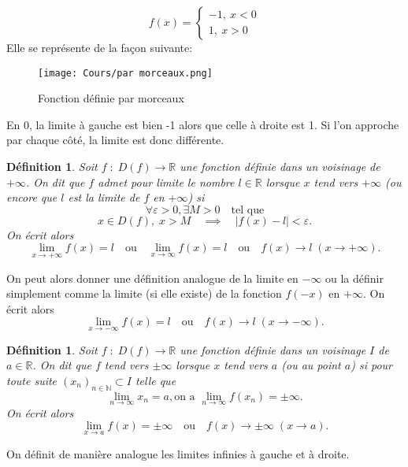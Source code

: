 \documentclass[a4paper, 12pt, french, twoside]{article}
\newtheorem{defi}[theorem]{Définition}
\newcommand{\Nn}{{\mathbb{N}}}
\newcommand{\Rr}{{\mathbb{R}}}
\begin{document}
\begin{equation}
    f(x)=\begin{cases}
        -1, ~ x< 0\\
        1,~ x>0
    \end{cases}
\end{equation}
Elle se représente de la façon suivante:
\begin{figure}[H]
    \centering
    \texttt{[image: Cours/par morceaux.png]}
    \caption{Fonction définie par morceaux    }
    \label{fig:enter-label}
\end{figure}
En 0, la limite à gauche est bien -1 alors que celle à droite est 1. Si l'on approche par chaque côté, la limite est donc différente.
\begin{defi}
    Soit $f\;:\;D(f)\longrightarrow\Rr$ une fonction définie dans un voisinage de $+\infty$.
    On dit que $f$ admet pour limite le nombre $l\in\Rr$ lorsque $x$ tend vers $+\infty$ (ou encore que $l$ est la limite de $f$ en $+\infty$) si
     \[
    \forall \varepsilon>0,\exists M>0 \quad\text{tel que}
    \]
    \[
    x\in D(f), \;x>M \quad \implies \quad |f(x)-l|<\varepsilon .
    \]
    On écrit alors \[
    \lim_{x\rightarrow +\infty}f(x)=l \quad \text{ou} \quad \lim_{x\rightarrow \infty}f(x)=l \quad \text{ou} \quad f(x)\longrightarrow l \; (x\rightarrow +\infty).
    \]
\end{defi}
On peut alors donner une définition analogue de la limite en $-\infty$ ou la définir simplement comme la limite (si elle existe) de la fonction $f(-x)$ en $+\infty$. On écrit alors \[
\lim_{x\rightarrow -\infty}f(x)=l \quad \text{ou} \quad f(x)\longrightarrow l \; (x\rightarrow -\infty).
\]
\begin{defi}
     Soit $f\;:\;D(f)\longrightarrow\Rr$ une fonction définie dans un voisinage $I$ de $a\in\Rr$. On dit que $f$ tend vers $\pm\infty$ lorsque $x$ tend vers $a$ (ou au point $a$) si pour toute suite $(x_n)_{n \in \Nn } \subset I$ telle que 
     \[
     \lim_{n\rightarrow \infty}x_n=a, \text{on a } \lim_{n\rightarrow \infty}f(x_n)=\pm\infty.
     \]
     On écrit alors \[
     \lim_{x\rightarrow a }f(x)=\pm\infty \quad \text{ou} \quad f(x)\longrightarrow\pm\infty \; (x\rightarrow a).
     \]
\end{defi}

On définit de manière analogue les limites infinies à gauche et à droite.
\end{document}
